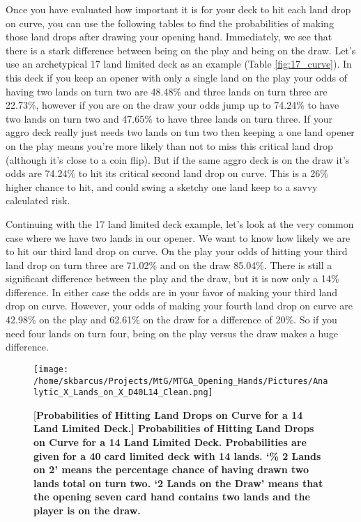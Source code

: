 \documentclass[oneside]{book}   %
\begin{document}
Once you have evaluated how important it is for your deck to hit each land drop on curve, you can use the following tables to find the probabilities of making those land drops after drawing your opening hand. Immediately, we see that there is a stark difference between being on the play and being on the draw. Let's use an archetypical 17 land limited deck as an example (Table \ref{fig:17_curve}). In this deck if you keep an opener with only a single land on the play your odds of having two lands on turn two are 48.48\% and three lands on turn three are 22.73\%, however if you are on the draw your odds jump up to 74.24\% to have two lands on turn two and 47.65\% to have three lands on turn three. If your aggro deck really just needs two lands on tun two then keeping a one land opener on the play means you're more likely than not to miss this critical land drop (although it's close to a coin flip). But if the same aggro deck is on the draw it's odds are 74.24\% to hit its critical second land drop on curve. This is a 26\% higher chance to hit, and could swing a sketchy one land keep to a savvy calculated risk.

Continuing with the 17 land limited deck example, let's look at the very common case where we have two lands in our opener. We want to know how likely we are to hit our third land drop on curve. On the play your odds of hitting your third land drop on turn three are 71.02\% and on the draw 85.04\%. There is still a significant difference between the play and the draw, but it is now only a 14\% difference. In either case the odds are in your favor of making your third land drop on curve. However, your odds of making your fourth land drop on curve are 42.98\% on the play and 62.61\% on the draw for a difference of 20\%. So if you need four lands on turn four, being on the play versus the draw makes a huge difference.

 	\begin{figure}[!ht]
	\centering
	\centerline{\texttt{[image: /home/skbarcus/Projects/MtG/MTGA\_Opening\_Hands/Pictures/Analytic\_X\_Lands\_on\_X\_D40L14\_Clean.png]}}
	[\bf{Probabilities of Hitting Land Drops on Curve for a 14 Land Limited Deck.}]{
	{\bf{Probabilities of Hitting Land Drops on Curve for a 14 Land Limited Deck.}} Probabilities are given for a 40 card limited deck with 14 lands. `\% 2 Lands on 2' means the percentage chance of having drawn two lands total on turn two. `2 Lands on the Draw' means that the opening seven card hand contains two lands and the player is on the draw.}
	\label{fig:14_curve}
	\end{figure}	
	
\end{document}
